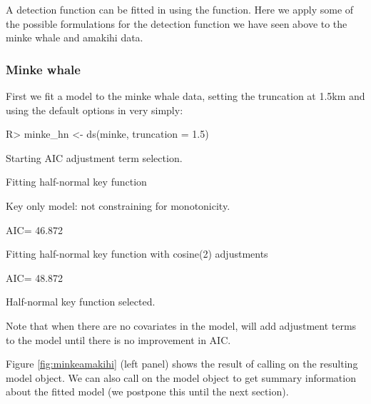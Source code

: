 \documentclass[article]{jss}\usepackage[]{graphicx}\usepackage[]{color}
\begin{document}
A detection function can be fitted in  using the  function. Here we apply some of the possible formulations for the detection function we have seen above to the minke whale and amakihi data.

\subsubsection{Minke whale}

First we fit a model to the minke whale data, setting the truncation at 1.5km and using the default options in  very simply:
\begin{Schunk}
\begin{Sinput}
R> minke_hn <- ds(minke, truncation = 1.5)
\end{Sinput}
\begin{Soutput}
Starting AIC adjustment term selection.
\end{Soutput}
\begin{Soutput}
Fitting half-normal key function
\end{Soutput}
\begin{Soutput}
Key only model: not constraining for monotonicity.
\end{Soutput}
\begin{Soutput}
AIC= 46.872
\end{Soutput}
\begin{Soutput}
Fitting half-normal key function with cosine(2) adjustments
\end{Soutput}
\begin{Soutput}
AIC= 48.872
\end{Soutput}
\begin{Soutput}

Half-normal key function selected.
\end{Soutput}
\end{Schunk}
Note that when there are no covariates in the model,  will add adjustment terms to the model until there is no improvement in AIC.

Figure \ref{fig:minkeamakihi} (left panel) shows the result of calling  on the resulting model object. We can also call  on the model object to get summary information about the fitted model (we postpone this until the next section).
\end{document}
